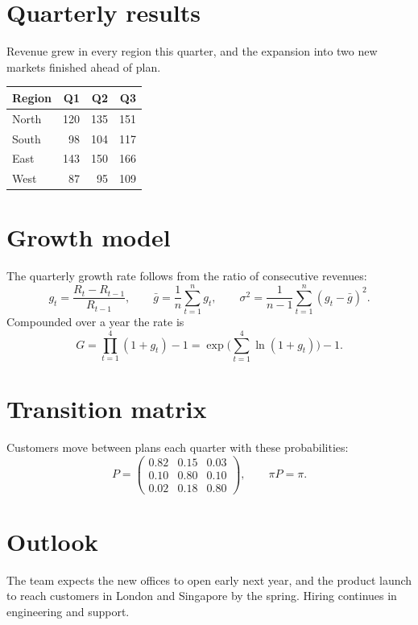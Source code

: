 \documentclass[11pt]{article}
\begin{document}
\section*{Quarterly results}
Revenue grew in every region this quarter, and the expansion into two new markets finished ahead of plan.

\begin{center}
\begin{tabular}{lrrr}
\toprule
Region & Q1 & Q2 & Q3 \\
\midrule
North & 120 & 135 & 151 \\
South & 98 & 104 & 117 \\
East & 143 & 150 & 166 \\
West & 87 & 95 & 109 \\
\bottomrule
\end{tabular}
\end{center}
\newpage
\section*{Growth model}
The quarterly growth rate follows from the ratio of consecutive revenues:
\[
  g_t = \frac{R_t - R_{t-1}}{R_{t-1}}, \qquad
  \bar{g} = \frac{1}{n}\sum_{t=1}^{n} g_t, \qquad
  \sigma^2 = \frac{1}{n-1}\sum_{t=1}^{n} \left(g_t - \bar{g}\right)^2 .
\]
Compounded over a year the rate is
\[
  G = \prod_{t=1}^{4} \left(1 + g_t\right) - 1 = \exp\!\Big(\sum_{t=1}^{4} \ln(1+g_t)\Big) - 1 .
\]
\newpage
\section*{Transition matrix}
Customers move between plans each quarter with these probabilities:
\[
  P = \begin{pmatrix} 0.82 & 0.15 & 0.03 \\ 0.10 & 0.80 & 0.10 \\ 0.02 & 0.18 & 0.80 \end{pmatrix},
  \qquad \pi P = \pi .
\]
\newpage
\section*{Outlook}
The team expects the new offices to open early next year, and the product launch to reach customers in London and
Singapore by the spring. Hiring continues in engineering and support.
\end{document}
